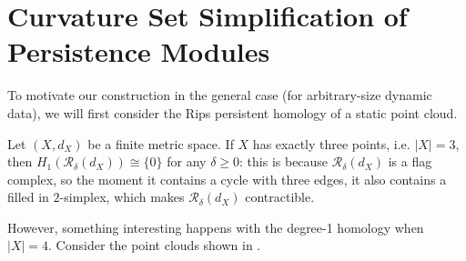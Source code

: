 \documentclass[a4paper,UKenglish,thm-restate]{article}
\theoremstyle{definition}
\begin{document}
\section{Curvature Set Simplification of Persistence Modules}
    To motivate our construction in the general case (for arbitrary-size dynamic data), we will first consider the Rips persistent homology of a static point cloud.
    
    Let $(X, d_X)$ be a finite metric space. If $X$ has exactly three points, i.e. $|X| = 3$, then $H_1(\mathcal{R}_\delta(d_X)) \cong \{ 0 \}$ for any $\delta \geq 0$: this is because $\mathcal{R}_\delta(d_X)$ is a flag complex, so the moment it contains a cycle with three edges, it also contains a filled in $2$-simplex, which makes $\mathcal{R}_\delta(d_X)$ contractible.
    
    However, something interesting happens with the degree-1 homology when $|X| = 4$. Consider the point clouds shown in . 
    
\end{document}
